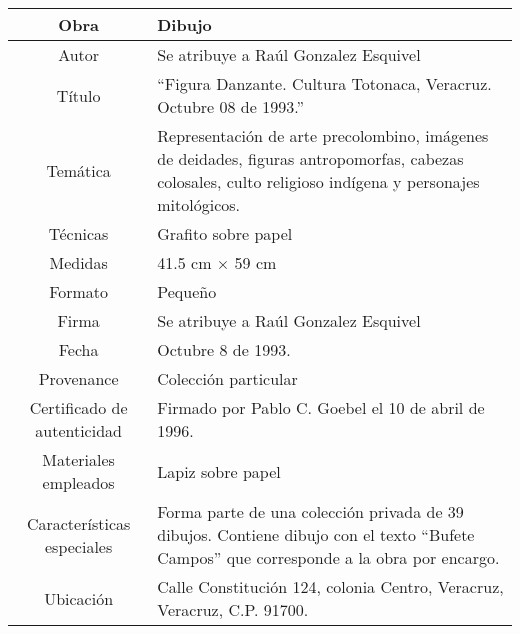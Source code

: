 \documentclass[10pt,letter]{report}
\begin{document}
\begin{table}[H]
\centering
\begin{tabular}{|c|m{}|}
\hline
Obra& Dibujo	\\
\hline
Autor & Se atribuye a Ra\'ul Gonzalez Esquivel\\
\hline
T\'itulo & ``Figura Danzante. Cultura Totonaca, Veracruz. Octubre 08 de 1993.''\\
\hline
Tem\'atica & Representaci\'on de arte precolombino, im\'agenes de deidades, figuras antropomorfas, cabezas colosales, culto religioso ind\'igena y personajes mitol\'ogicos.\\
\hline
T\'ecnicas &Grafito sobre papel \\
\hline
Medidas & 41.5 cm $\times$ 59 cm \\
\hline
 Formato & Peque\~no \\
 \hline
 Firma & Se atribuye a Ra\'ul Gonzalez Esquivel\\ 
 \hline
  Fecha & Octubre 8 de 1993.\\
 \hline
 Provenance & Colecci\'on particular\\
 \hline
 Certificado de autenticidad& Firmado por Pablo C. Goebel el 10 de abril de 1996.  \\
 \hline 
  Materiales empleados & Lapiz sobre papel\\
 \hline
 Caracter\'isticas especiales & Forma parte de una colecci\'on privada de 39 dibujos. 
Contiene dibujo con el texto ``Bufete Campos'' que corresponde a la obra por encargo. \\
\hline 
Ubicaci\'on & Calle Constituci\'on 124, colonia Centro, Veracruz, Veracruz, C.P. 91700.\\
\hline

\end{tabular}
\end{table}
\end{document}
